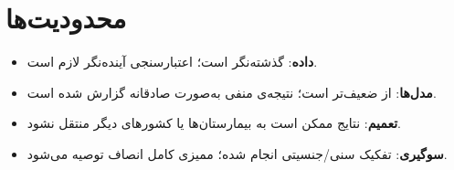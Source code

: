 \section{محدودیت‌ها}

\begin{itemize}
\item \textbf{داده}:  گذشته‌نگر است؛ اعتبارسنجی آینده‌نگر لازم است.
\item \textbf{مدل‌ها}:  از  ضعیف‌تر است؛ نتیجه‌ی منفی به‌صورت صادقانه گزارش شده است.
\item \textbf{تعمیم}: نتایج ممکن است به بیمارستان‌ها یا کشورهای دیگر منتقل نشود.
\item \textbf{سوگیری}: تفکیک سنی/جنسیتی انجام شده؛ ممیزی کامل انصاف توصیه می‌شود.
\end{itemize}
